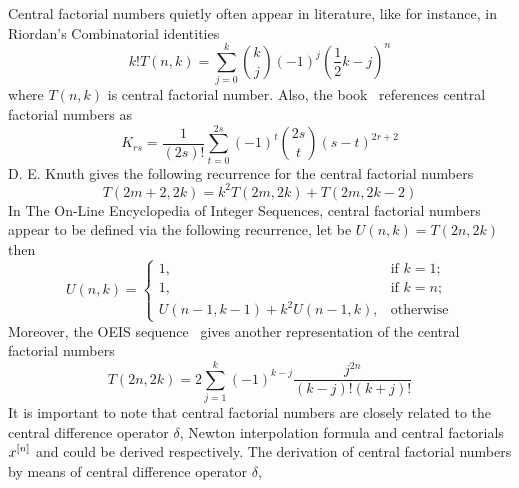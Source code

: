 Central factorial numbers quietly often appear in literature, like for instance, in Riordan's
Combinatorial identities~\cite[p. 217]{riordan1968combinatorial}
\begin{equation}
    k! T(n,k) = \sum_{j=0}^{k} \binom{k}{j} (-1)^{j} \left( \frac{1}{2}k - j \right)^{n}
    \label{eq:cfn-riordan}
\end{equation}
where $T(n,k)$ is central factorial number.
Also, the book~\cite[formula (10a)]{carlitz_riordan_1963} references central factorial numbers as
\begin{equation*}
    K_{rs} = \frac{1}{(2s)!} \sum_{t=0}^{2s} (-1)^t \binom{2s}{t} (s-t)^{2r+2}
\end{equation*}
D. E. Knuth gives the following recurrence for the central factorial numbers~\cite[p. 284]{knuth1993johann}
\begin{equation*}
    T(2m+2, 2k) = k^2 T(2m,2k) + T(2m, 2k - 2)
\end{equation*}
In The On-Line Encyclopedia of Integer Sequences, central factorial numbers~\cite{sloane2000centralfactorial}
appear to be defined via the following recurrence, let be $U(n,k) = T(2n,2k)$ then
\begin{equation*}
    U(n,k) = \begin{cases}
        1, & \text{if } k=1; \\
        1, & \text{if } k=n; \\
        U(n-1, k-1) + k^2 U(n-1, k), & \text{otherwise}
    \end{cases}
\end{equation*}
Moreover, the OEIS sequence~\cite{sloane2000triangle} gives another representation of the central factorial numbers
\begin{equation*}
    T(2n,2k) = 2 \sum_{j=1}^{k} (-1)^{k-j} \frac{j^{2n}}{(k-j)! (k+j)!}
\end{equation*}
It is important to note that central factorial numbers are closely related to the central difference operator $\delta$,
Newton interpolation formula and central factorials $x^{[n]}$ and could be derived respectively.
The derivation of central factorial numbers by means of central difference operator $\delta$,
